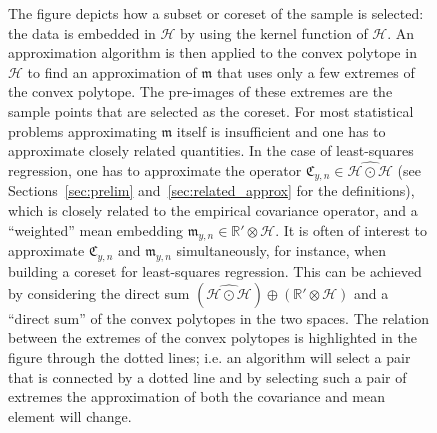 \documentclass[10pt]{amsart}
\theoremstyle{definition}\newtheorem{defi}[theo]{Definition}\newtheorem{rema}[theo]{Remark}\newtheorem{exam}[theo]{Example}\newtheorem{exem}[theo]{Example}\newtheorem{nota}[theo]{Notation}
\theoremstyle{remark}
\newcommand{\R}{\mathbb{R}}
\newcommand{\dR}{{\R'}}
\newcommand{\cH}{\mathcal{H}}
\newcommand{\fkC}{\mathfrak{C}}
\newcommand{\mean}{\mathfrak{m}}
\begin{document}
\begin{figure}[!h]
{ The figure depicts how a subset or coreset of the sample is selected: the data is embedded in $\cH$ by using the kernel function of $\cH$. An approximation algorithm is then applied to the convex polytope in $\cH$ to find an approximation of $\mean$ that uses only a few extremes of the convex polytope. The pre-images of these extremes are the sample points that are selected as the coreset.  For most statistical problems approximating $\mean$ itself is insufficient and one has to approximate closely related quantities. In the case of least-squares regression, one has to approximate the operator $\fkC_{y,n} \in \widehat{\cH \odot \cH}$ (see Sections~\ref{sec:prelim} and~\ref{sec:related_approx} for the definitions), which is closely related to the empirical covariance operator, and a ``weighted'' mean embedding $\mean_{y,n} \in \dR \otimes \cH$. It is often of interest to approximate $\fkC_{y,n}$ and $\mean_{y,n}$ simultaneously, for instance, when building a coreset for least-squares regression. This can be achieved by considering the direct sum $(\widehat{\cH \odot \cH}) \oplus (\dR \otimes \cH)$ and a ``direct sum'' of the convex polytopes in the two spaces. The relation between the extremes of the convex polytopes is highlighted in the figure through the dotted lines; i.e. an algorithm will select a pair that is connected by a dotted line and by selecting such a pair of extremes the approximation of both the covariance and mean element will change.}
\end{figure}
\end{document}
